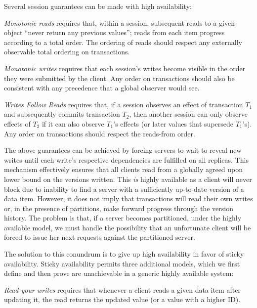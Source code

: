 Several session guarantees can be made with high availability:

\vspace{.5em}\noindent\textit{{Monotonic reads}} requires that, within
a session, subsequent reads to a given object ``never return any
previous values''; reads from each item progress according to a total
order. The ordering of reads should respect any externally observable
total ordering on transactions.

\vspace{.5em}\noindent\textit{{Monotonic writes}} requires that each
session's writes become visible in the order they were submitted by
the client. Any order on transactions should also be consistent with
any precedence that a global observer would see.

\vspace{.5em}\noindent\textit{{Writes Follow Reads}} requires that, if
a session observes an effect of transaction $T_1$ and subsequently
commits transaction $T_2$, then another session can only observe
effects of $T_2$ if it can also observe $T_1$'s effects (or later
values that supersede $T_1$'s).  Any order on transactions should
respect the reads-from order.\vspace{.5em}

The above guarantees can be achieved by forcing servers to wait to
reveal new writes until each write's respective dependencies are
fulfilled on all replicas. This mechanism effectively ensures that all
clients read from a globally agreed upon lower bound on the versions
written. This \textit{is} highly available as a client
will never block due to inability to find a server with a sufficiently
up-to-date version of a data item. However, it does not imply that
transactions will read their own writes or, in the presence of
partitions, make forward progress through the version history. The
problem is that, if a server becomes partitioned, under the highly
available model, we must handle the possibility that an unfortunate
client will be forced to issue her next requests against the
partitioned server.

The solution to this conundrum is to give up high availability in
favor of sticky availability. Sticky availability permits three
additional models, which we first define and then prove are
unachievable in a generic highly available system:

\vspace{.5em}\noindent\textit{{Read your writes}} requires
that whenever a client reads a given data item after updating it, the
read returns the updated value (or a value with a higher ID).

